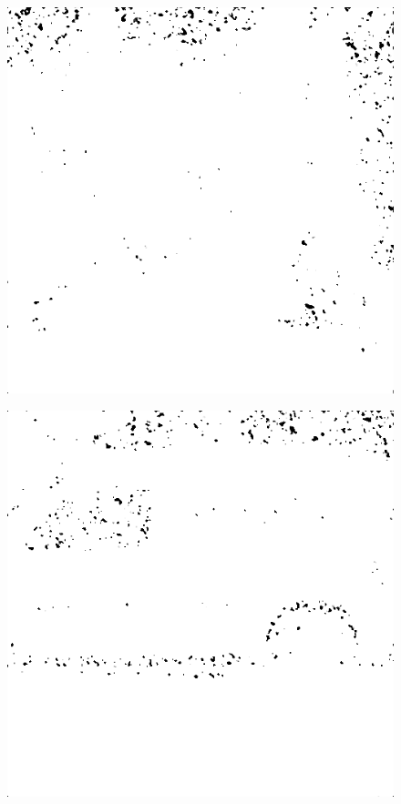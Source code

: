 \begin{figure}[H]
\begin{minipage}[t]{0.3\linewidth}
	\subcaption{}
	\label{fig:hus_m25}
\end{minipage}
\begin{minipage}[t]{0.3\linewidth} %
	\includegraphics[width = 1\linewidth]{gfx/sit/sit_m25.png}
	\subcaption{}
	\label{fig:sit_m25}
\end{minipage}
\begin{minipage}[t]{0.3\linewidth} %
	\includegraphics[width = 1\linewidth]{gfx/car/car_m30.png}

\end{minipage}
\end{figure}
